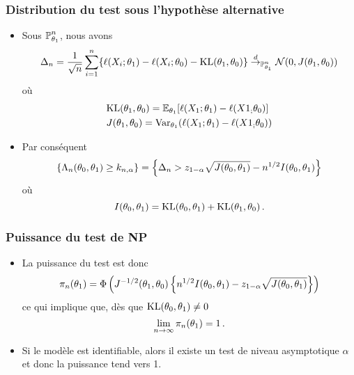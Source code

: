 \begin{frame}
\frametitle{Distribution du test sous l'hypothèse alternative}
\begin{itemize}
\item Sous $\operatorname{{\mathbb P}}^n_{\theta_1}$, nous avons
\[
\Delta_n= \frac{1}{\sqrt{n}} \sum_{i=1}^n \{ \ell(X_i;\theta_1) -
\ell(X_i;\theta_0) - \mathrm{KL}(\theta_1,\theta_0) \}
\stackrel{d}{\rightarrow}_{\operatorname{{\mathbb P}}^n_{\theta_1}} \mathcal{N}( 0, J(\theta_1,\theta_0) )
\]
où
\begin{align*}
&\mathrm{KL}(\theta_1,\theta_0)= \operatorname{{\mathbb E}}_{\theta_1}[ \ell(X_1;\theta_1) - \ell(X1_;\theta_0)]  \\
&J(\theta_1,\theta_0) = \operatorname{\mathrm{Var}}_{\theta_1} ( \ell(X_1;\theta_1) - \ell(X1_;\theta_0) )
\end{align*}
\pause \item Par conséquent
\[
\{ \Lambda_n(\theta_0,\theta_1) \geq k_{n,\alpha} \} = \left\{ \Delta_n
  > z_{1-\alpha} \sqrt{J(\theta_0,\theta_1)} - n^{1/2}
  I(\theta_0,\theta_1) \right\} 
\]
où
$$
I(\theta_0,\theta_1)= \mathrm{KL}(\theta_0,\theta_1) + \mathrm{KL}(\theta_1,\theta_0) \,.
$$
\end{itemize}
\end{frame}

\begin{frame}
\frametitle{Puissance du test de NP}
\begin{itemize}
\item La puissance du test est donc
\[
\pi_n(\theta_1)= \Phi\left( J^{-1/2}(\theta_1,\theta_0) \left\{ n^{1/2} I(\theta_0,\theta_1) - z_{1-\alpha} \sqrt{J(\theta_0,\theta_1)} \right\} \right)
\]
ce qui implique que, dès que $\mathrm{KL}(\theta_0,\theta_1) \ne 0$
\[
\lim_{n \to \infty} \pi_n(\theta_1)= 1 \,.
\]
\item Si le modèle est identifiable, alors il existe un test de niveau asymptotique $\alpha$ et donc la puissance tend vers 1.
\end{itemize}
\end{frame}

